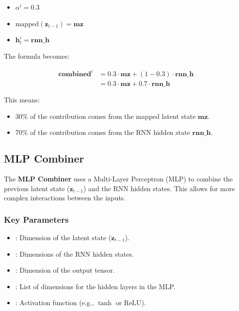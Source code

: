 \begin{itemize}
    \item $\alpha^i = 0.3$
    \item $\text{mapped}(\bm{z}_{t-1}) = \bm{mz}$
    \item $\bm{h}_{t}^{i} = \bm{rnn\_h}$
\end{itemize}

The formula becomes:

\begin{align*}
    \bm{combined}^i &= 0.3 \cdot \bm{mz} + 
    (1 - 0.3) \cdot \bm{rnn\_h} \\
    &= 0.3 \cdot \bm{mz} + 0.7 \cdot \bm{rnn\_h}
\end{align*}

This means:
\begin{itemize}
    \item 30\% of the contribution comes from the mapped latent state 
    $\bm{mz}$.
    \item 70\% of the contribution comes from the RNN hidden state 
    $\bm{rnn\_h}$.
\end{itemize}

\subsection{MLP Combiner}

The \textbf{MLP Combiner} uses a Multi-Layer Perceptron (MLP) to combine
the previous latent state ($\bm{z}_{t-1}$) and the RNN hidden states.
This allows for more complex interactions between the inputs.

\subsubsection*{Key Parameters}
\begin{itemize}
    \item {}: Dimension of the latent state ($\bm{z}_{t-1}$).
    \item {}: Dimensions of the RNN hidden states.
    \item {}: Dimension of the output tensor.
    \item {}: List of dimensions for the hidden
    layers in the MLP.
    \item {}: Activation function 
    (e.g., $\tanh$ or $\text{ReLU}$).
\end{itemize}

